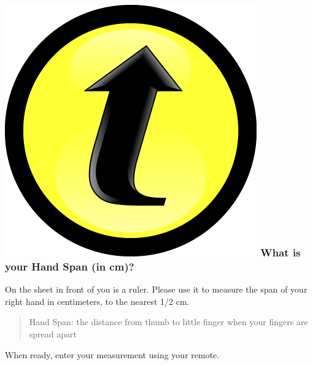 \documentclass[handout]{beamer}
\begin{document}
\begin{frame}

\frametitle{\includegraphics[scale = 0.05]{./images/clicker} \hfill  What is your Hand Span (in cm)?}

On the sheet in front of you is a ruler. Please use it to measure the span of your right hand in centimeters, to the nearest 1/2 cm. 

\vspace{2em}
\begin{quote}Hand Span: the distance from thumb to little finger when your fingers are spread apart\end{quote}

\vspace{2em}
When ready, enter your measurement using your remote.
\end{frame}
\end{document}
